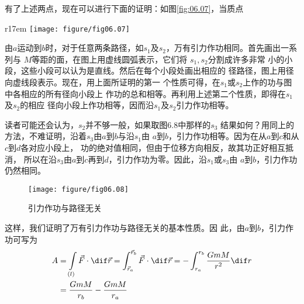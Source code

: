有了上述两点，现在可以进行下面的证明：如图\ref{fig:06.07}，当质点
\begin{wrapfigure}[10]{r}{17em}
  \vspace{-1.3em}
  \centering
  \texttt{[image: figure/fig06.07]}
  \caption{引力作功与路径无关}
  \label{fig:06.07}
\end{wrapfigure}
由$ a $运动到$ b $时，对于任意两条路径，如$ s _ { 1 } $及$
  s _ { 2 } $，万有引力作功相同。首先画出一系列与
$ M $等距的面，在图上用虚线圆弧表示，它们将
$ s _ { 1 } , s _ { 2 } $分割成许多非常
小的小段，这些小段可以认为是直线。然后在每个小段处画出相应的
径路径，图上用径向虚线段表示。现在，用上面所证明的第一
个性质可得，在$ s _ { 1 } $或$ s _ { 2 } $上作的功与图中各相应的所有径向小段上
作功的总和相等。再利用上述第二个性质，即得在$ s _ { 1 } $ 及$ s _ { 2 } $的相应
径向小段上作功相等，因而沿$ s _ { 1 } $及$ s _ { 2 } $引力作功相等。

读者可能还会认为，$ s _ { 2 } $并不够一般，如果取图6.8中那样的$ s _ { 3 } $
结果如何？用同上的方法，不难证明，沿着$ s _ { 3 } $由$ a $到$ b $与沿$ s _ { 1 } $由
$ a $到$ b $，引力作功相等。因为在从$ a $到$ c $和从$ c $到$ d $各对应小段上，
功的绝对值相同，但由于位移方向相反，故其功正好相互抵消，
所以在沿$ s _ { 3 } $由$ a $到$ c $再到$ d $，引力作功为零。因此，沿$ s _ { 1 } $或$ s _ { 3 } $由
$ a $到$ b $，引力作功仍然相同。

\begin{figure}[h]
  \centering
  \texttt{[image: figure/fig06.08]}
  \caption{引力作功与路径无关}
  \label{fig:06.08}
  \vspace{-0.8em}
\end{figure}

这样，我们证明了万有引力作功与路径无关的基本性质。因
此，由$ a $到$ b $，引力作功可写为
\begin{equation}\label{eqn:06.03.01}
  \begin{aligned}
    A & = \int \limits _{(l)} \vec{F} \cdot \dif \vec{r} = \int _ { \vec{r}_a } ^ { \vec{r}_b } \vec{F} \cdot \dif \vec{r} = - \int _ { r _ a } ^ { r _ b } \frac { G m M } { r ^ { 2 } } \dif r \\
      & = \frac { G m M } { r _ { b } } - \frac { G m M } { r _ { a } }
  \end{aligned}
\end{equation}

